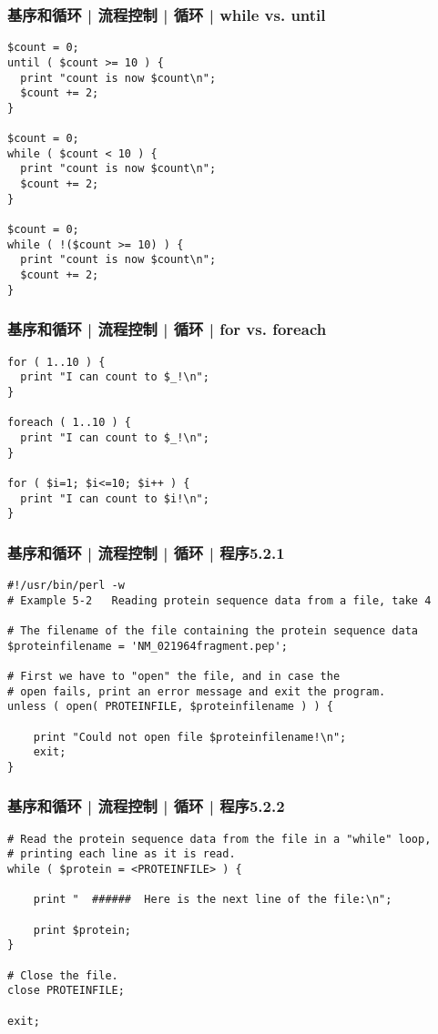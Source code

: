 \begin{frame}[fragile]
  \frametitle{基序和循环 | 流程控制 | 循环 | while vs. until}
\begin{lstlisting}[basicstyle=\small\tt]
$count = 0;
until ( $count >= 10 ) {
  print "count is now $count\n";
  $count += 2;
}

$count = 0;
while ( $count < 10 ) {
  print "count is now $count\n";
  $count += 2;
}

$count = 0;
while ( !($count >= 10) ) {
  print "count is now $count\n";
  $count += 2;
}
\end{lstlisting}
\end{frame}

\begin{frame}[fragile]
  \frametitle{基序和循环 | 流程控制 | 循环 | for vs. foreach}
\begin{lstlisting}
for ( 1..10 ) {
  print "I can count to $_!\n";
}

foreach ( 1..10 ) {
  print "I can count to $_!\n";
}

for ( $i=1; $i<=10; $i++ ) {
  print "I can count to $i!\n";
}
\end{lstlisting}
\end{frame}

\begin{frame}[fragile]
  \frametitle{基序和循环 | 流程控制 | 循环 | 程序5.2.1}
  \vspace{-0.5em}
\begin{lstlisting}[basicstyle=\small\tt]
#!/usr/bin/perl -w
# Example 5-2   Reading protein sequence data from a file, take 4

# The filename of the file containing the protein sequence data
$proteinfilename = 'NM_021964fragment.pep';

# First we have to "open" the file, and in case the
# open fails, print an error message and exit the program.
unless ( open( PROTEINFILE, $proteinfilename ) ) {

    print "Could not open file $proteinfilename!\n";
    exit;
}
\end{lstlisting}  
\end{frame}

\begin{frame}[fragile]
  \frametitle{基序和循环 | 流程控制 | 循环 | 程序5.2.2}
\begin{lstlisting}[firstnumber=15]
# Read the protein sequence data from the file in a "while" loop,
# printing each line as it is read.
while ( $protein = <PROTEINFILE> ) {

    print "  ######  Here is the next line of the file:\n";

    print $protein;
}

# Close the file.
close PROTEINFILE;

exit;
\end{lstlisting}  
\end{frame}

